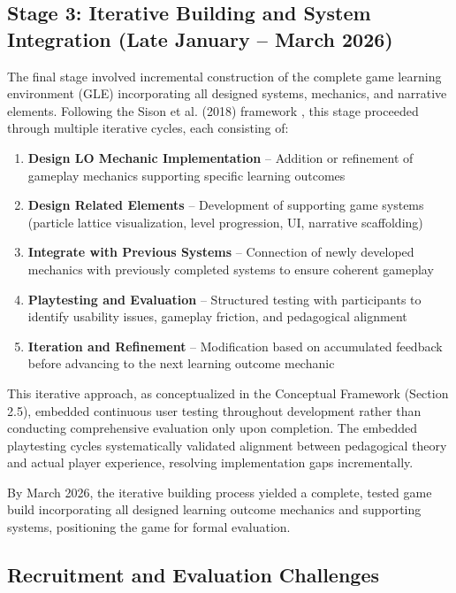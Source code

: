 \subsection{Stage 3: Iterative Building and System Integration (Late January -- March 2026)}

The final stage involved incremental construction of the complete game learning environment (GLE) incorporating all designed systems, mechanics, and narrative elements. Following the Sison et al. (2018) framework \cite{Sison2018}, this stage proceeded through multiple iterative cycles, each consisting of:

\begin{enumerate}
    \item \textbf{Design LO Mechanic Implementation} -- Addition or refinement of gameplay mechanics supporting specific learning outcomes
    \item \textbf{Design Related Elements} -- Development of supporting game systems (particle lattice visualization, level progression, UI, narrative scaffolding)
    \item \textbf{Integrate with Previous Systems} -- Connection of newly developed mechanics with previously completed systems to ensure coherent gameplay
    \item \textbf{Playtesting and Evaluation} -- Structured testing with participants to identify usability issues, gameplay friction, and pedagogical alignment
    \item \textbf{Iteration and Refinement} -- Modification based on accumulated feedback before advancing to the next learning outcome mechanic
\end{enumerate}

This iterative approach, as conceptualized in the Conceptual Framework (Section 2.5), embedded continuous user testing throughout development rather than conducting comprehensive evaluation only upon completion. The embedded playtesting cycles systematically validated alignment between pedagogical theory and actual player experience, resolving implementation gaps incrementally.

By March 2026, the iterative building process yielded a complete, tested game build incorporating all designed learning outcome mechanics and supporting systems, positioning the game for formal evaluation.

\subsection{Recruitment and Evaluation Challenges}

